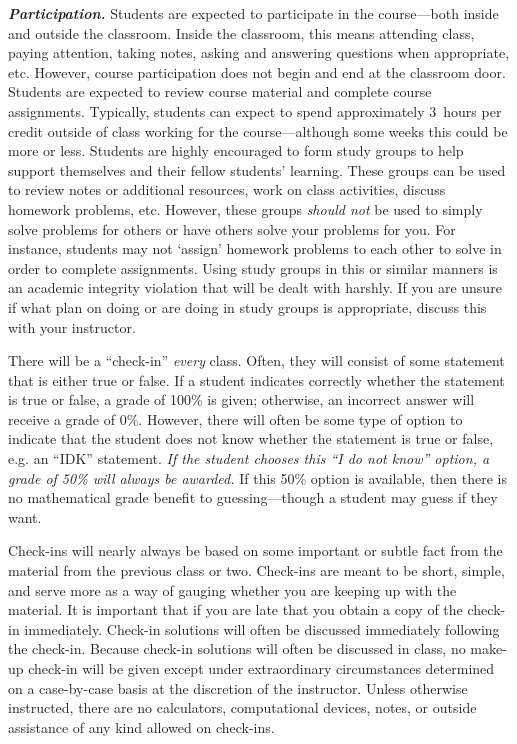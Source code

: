 \documentclass[11pt,letterpaper]{article}
\begin{document}
{\itshape\bfseries\color{scred}Participation.} Students are expected to participate in the course---both inside and outside the classroom. Inside the classroom, this means attending class, paying attention, taking notes, asking and answering questions when appropriate, etc. However, course participation does not begin and end at the classroom door. Students are expected to review course material and complete course assignments. Typically, students can expect to spend approximately 3~hours per credit outside of class working for the course---although some weeks this could be more or less. Students are highly encouraged to form study groups to help support themselves and their fellow students' learning. These groups can be used to review notes or additional resources, work on class activities, discuss homework problems, etc. However, these groups {\itshape should not} be used to simply solve problems for others or have others solve your problems for you. For instance, students may not `assign' homework problems to each other to solve in order to complete assignments. Using study groups in this or similar manners is an academic integrity violation that will be dealt with harshly. If you are unsure if what plan on doing or are doing in study groups is appropriate, discuss this with your instructor. \sectionbreak




There will be a ``check-in'' \textit{every} class. Often, they will consist of some statement that is either true or false. If a student indicates correctly whether the statement is true or false, a grade of 100\% is given; otherwise, an incorrect answer will receive a grade of 0\%. However, there will often be some type of option to indicate that the student does not know whether the statement is true or false, e.g. an ``IDK'' statement. {\itshape If the student chooses this ``I do not know'' option, a grade of 50\% will always be awarded.} If this 50\% option is available, then there is no mathematical grade benefit to guessing---though a student may guess if they want. \pspace

Check-ins will nearly always be based on some important or subtle fact from the material from the previous class or two. Check-ins are meant to be short, simple, and serve more as a way of gauging whether you are keeping up with the material. It is important that if you are late that you obtain a copy of the check-in immediately. Check-in solutions will often be discussed immediately following the check-in. Because check-in solutions will often be discussed in class, no make-up check-in will be given except under extraordinary circumstances determined on a case-by-case basis at the discretion of the instructor. Unless otherwise instructed, there are no calculators, computational devices, notes, or outside assistance of any kind allowed on check-ins. 
\sectionbreak
\end{document}
